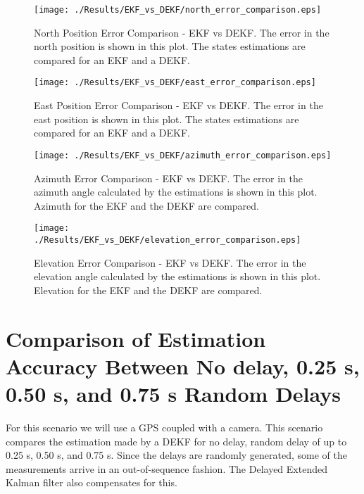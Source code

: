 \begin{figure}[H]
  \centering
  \texttt{[image: ./Results/EKF\_vs\_DEKF/north\_error\_comparison.eps]}
  \caption[North Position Error Comparison - EKF vs DEKF]{North Position Error Comparison - EKF vs DEKF. The error in the north position is shown in this plot. The states estimations are compared for an EKF and a DEKF.}
\end{figure}

\begin{figure}[H]
  \centering
  \texttt{[image: ./Results/EKF\_vs\_DEKF/east\_error\_comparison.eps]}
  \caption[East Position Error Comparison - EKF vs DEKF]{East Position Error Comparison - EKF vs DEKF. The error in the east position is shown in this plot. The states estimations are compared for an EKF and a DEKF.}
\end{figure}

\begin{figure}[H]
  \centering
  \texttt{[image: ./Results/EKF\_vs\_DEKF/azimuth\_error\_comparison.eps]}
  \caption[Azimuth Error Comparison - EKF vs DEKF]{Azimuth Error Comparison - EKF vs DEKF. The error in the azimuth angle calculated by the estimations is shown in this plot. Azimuth for the EKF and the DEKF are compared.}
\end{figure}

\begin{figure}[H]
  \centering
  \texttt{[image: ./Results/EKF\_vs\_DEKF/elevation\_error\_comparison.eps]}
  \caption[Elevation Error Comparison - EKF vs DEKF]{Elevation Error Comparison - EKF vs DEKF. The error in the elevation angle calculated by the estimations is shown in this plot. Elevation for the EKF and the DEKF are compared.}
\end{figure}

\section{Comparison of Estimation Accuracy Between No delay, 0.25 s, 0.50 s, and 0.75 s Random Delays}
For this scenario we will use a GPS coupled with a camera. This scenario compares the estimation made by a DEKF for no delay, random delay of up to 0.25 s, 0.50 s, and 0.75 s. Since the delays are randomly generated, some of the measurements arrive in an out-of-sequence fashion. The Delayed Extended Kalman filter also compensates for this.


